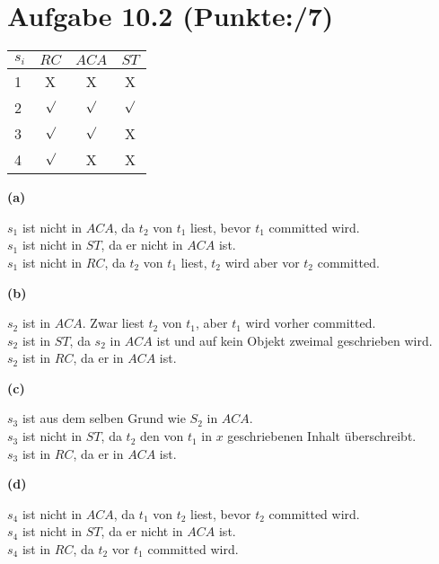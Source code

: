 \documentclass[11pt, a4paper]{article}
\newcommand{\blattnummer}{10}
\newcommand{\pp}{7}
\newcommand{\aufgabe}[2] {\section*{Aufgabe \blattnummer.#1 (Punkte:\qquad/#2)}}
\newcommand{\aufgabenteil}[1] {\textbf{(#1)}}
\begin{document}
\aufgabe{2}{\pp}

\begin{table}[h!]
  \centering
  \begin{tabular}{l|c|c|c}
    $s_i$ & $RC$ & $ACA$ & $ST$\\
    \hline
    	1 & X & X & X\\
	2 & $\surd$  & $\surd$  & $\surd$ \\
	3 & $\surd$ & $\surd$ & X\\
	4 & $\surd$ & X & X\\
  \end{tabular}
\end{table}

\aufgabenteil{a}
\begin{adjustwidth}{20pt}{20pt}
$s_1$ ist nicht in $ACA$, da $t_2$ von $t_1$ liest, bevor $t_1$ committed wird.\\
$s_1$ ist nicht in $ST$, da er nicht in $ACA$ ist.\\
$s_1$ ist nicht in $RC$, da $t_2$ von $t_1$ liest, $t_2$ wird aber vor $t_2$ committed.\\
\end{adjustwidth}
\aufgabenteil{b}
\begin{adjustwidth}{20pt}{20pt}
$s_2$ ist in $ACA$. Zwar liest $t_2$ von $t_1$, aber $t_1$ wird vorher committed.\\
$s_2$ ist in $ST$, da $s_2$ in $ACA$ ist und auf kein Objekt zweimal geschrieben wird.\\
$s_2$ ist in $RC$, da er in $ACA$ ist.\\
\end{adjustwidth}
\aufgabenteil{c}
\begin{adjustwidth}{20pt}{20pt}
$s_3$ ist aus dem selben Grund wie $S_2$ in $ACA$.\\
$s_3$ ist nicht in $ST$, da $t_2$ den von $t_1$ in $x$ geschriebenen Inhalt überschreibt.\\
$s_3$ ist in $RC$, da er in $ACA$ ist.\\
\end{adjustwidth}
\aufgabenteil{d}
\begin{adjustwidth}{20pt}{20pt}
$s_4$ ist nicht in $ACA$, da $t_1$ von $t_2$ liest, bevor $t_2$ committed wird.\\
$s_4$ ist nicht in $ST$, da er nicht in $ACA$ ist.\\
$s_4$ ist in $RC$, da $t_2$ vor $t_1$ committed wird.\\
\end{adjustwidth}
\end{document}
